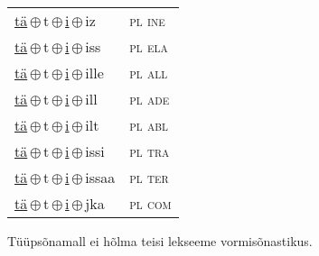 \begin{minipage}{\textwidth}
\begin{sideways}
\begin{tabular}{l l}
\underline{tä}\,$\oplus$\,t\,$\oplus$\,\underline{i}\,$\oplus$\,iz & \textsc{ pl ine } \\
\underline{tä}\,$\oplus$\,t\,$\oplus$\,\underline{i}\,$\oplus$\,iss & \textsc{ pl ela } \\
\underline{tä}\,$\oplus$\,t\,$\oplus$\,\underline{i}\,$\oplus$\,ille & \textsc{ pl all } \\
\underline{tä}\,$\oplus$\,t\,$\oplus$\,\underline{i}\,$\oplus$\,ill & \textsc{ pl ade } \\
\underline{tä}\,$\oplus$\,t\,$\oplus$\,\underline{i}\,$\oplus$\,ilt & \textsc{ pl abl } \\
\underline{tä}\,$\oplus$\,t\,$\oplus$\,\underline{i}\,$\oplus$\,issi & \textsc{ pl tra } \\
\underline{tä}\,$\oplus$\,t\,$\oplus$\,\underline{i}\,$\oplus$\,issaa & \textsc{ pl ter } \\
\underline{tä}\,$\oplus$\,t\,$\oplus$\,\underline{i}\,$\oplus$\,jka & \textsc{ pl com } \\
\end{tabular}
\end{sideways}
\label{tab:tüüpsõnamall-täti}

\end{minipage}

 
\vspace{1em}
\noindent Tüüpsõnamall  ei hõlma teisi lekseeme vormi\-sõnastikus.
